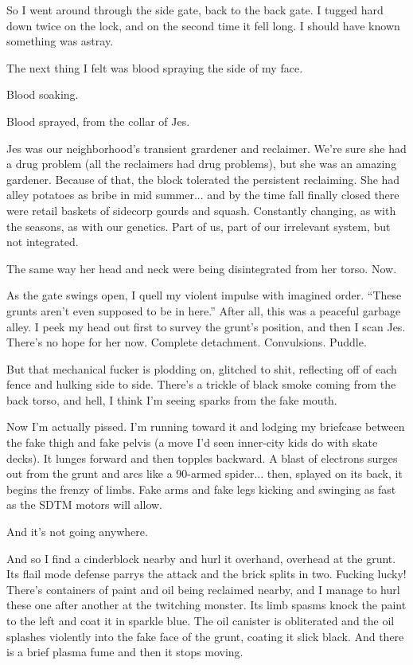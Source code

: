 \documentclass{amsbook}
\begin{document}
So I went around through the side gate, back to the back gate.  I tugged hard down twice on the lock, and on the second time it fell long.  I should have known something was astray.

The next thing I felt was blood spraying the side of my face.

Blood soaking.

Blood sprayed, from the collar of Jes.

Jes was our neighborhood's transient grardener and reclaimer.  We're sure she had a drug problem (all the reclaimers had drug problems), but she was an amazing gardener.  Because of that, the block tolerated the persistent reclaiming.  She had alley potatoes as bribe in mid summer... and by the time fall finally closed there were retail baskets of sidecorp gourds and squash.  Constantly changing, as with the seasons, as with our genetics.  Part of us, part of our irrelevant system, but not integrated.

The same way her head and neck were being disintegrated from her torso.  Now.

As the gate swings open, I quell my violent impulse with imagined order.  ``These grunts aren't even supposed to be in here.''  After all, this was a peaceful garbage alley.  I peek my head out first to survey the grunt's position, and then I scan Jes.  There's no hope for her now.  Complete detachment.  Convulsions.  Puddle.

But that mechanical fucker is plodding on, glitched to shit, reflecting off of each fence and hulking side to side. There's a trickle of black smoke coming from the back torso, and hell, I think I'm seeing sparks from the fake mouth.

Now I'm actually pissed.  I'm running toward it and lodging my briefcase between the fake thigh and fake pelvis (a move I'd seen inner-city kids do with skate decks).  It lunges forward and then topples backward.  A blast of electrons surges out from the grunt and arcs like a 90-armed spider... then, splayed on its back, it begins the frenzy of limbs.  Fake arms and fake legs kicking and swinging as fast as the SDTM motors will allow.

And it's not going anywhere.

And so I find a cinderblock nearby and hurl it overhand, overhead at the grunt.  Its flail mode defense parrys the attack and the brick splits in two.  Fucking lucky!  There's containers of paint and oil being reclaimed nearby, and I manage to hurl these one after another at the twitching monster.  Its limb spasms knock the paint to the left and coat it in sparkle blue.  The oil canister is obliterated and the oil splashes violently into the fake face of the grunt, coating it slick black.  And there is a brief plasma fume and then it stops moving.
\end{document}
